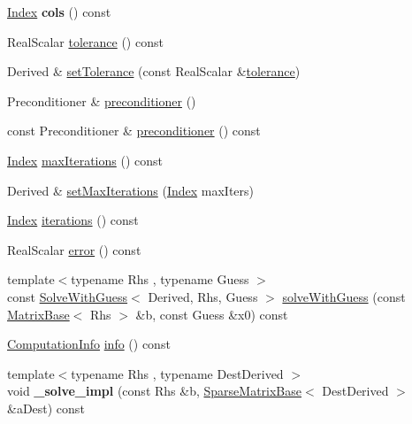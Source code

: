\begin{DoxyCompactItemize}
\hyperlink{namespace_eigen_a62e77e0933482dafde8fe197d9a2cfde}{Index} {\bfseries cols} () const
\item 
Real\+Scalar \hyperlink{group___iterative_linear_solvers___module_acb442c19b5858d6b9be813dd7d36cc62}{tolerance} () const
\item 
Derived \& \hyperlink{group___iterative_linear_solvers___module_ac160a444af8998f93da9aa30e858470d}{set\+Tolerance} (const Real\+Scalar \&\hyperlink{group___iterative_linear_solvers___module_acb442c19b5858d6b9be813dd7d36cc62}{tolerance})
\item 
Preconditioner \& \hyperlink{group___iterative_linear_solvers___module_a5e88f2a323a2900205cf807af94f8051}{preconditioner} ()
\item 
const Preconditioner \& \hyperlink{group___iterative_linear_solvers___module_a709a056e17c49b5272e4971bc376cbe4}{preconditioner} () const
\item 
\hyperlink{namespace_eigen_a62e77e0933482dafde8fe197d9a2cfde}{Index} \hyperlink{group___iterative_linear_solvers___module_a168a74c8dceb6233b220031fdd756ba0}{max\+Iterations} () const
\item 
Derived \& \hyperlink{group___iterative_linear_solvers___module_af83de7a7d31d9d4bd1fef6222b07335b}{set\+Max\+Iterations} (\hyperlink{namespace_eigen_a62e77e0933482dafde8fe197d9a2cfde}{Index} max\+Iters)
\item 
\hyperlink{namespace_eigen_a62e77e0933482dafde8fe197d9a2cfde}{Index} \hyperlink{group___iterative_linear_solvers___module_ae778dd098bd5e6655625b20b1e9f15da}{iterations} () const
\item 
Real\+Scalar \hyperlink{group___iterative_linear_solvers___module_a117c241af3fb1141ad0916a3cf3157ec}{error} () const
\item 
{\footnotesize template$<$typename Rhs , typename Guess $>$ }\\const \hyperlink{group___iterative_linear_solvers___module_class_eigen_1_1_solve_with_guess}{Solve\+With\+Guess}$<$ Derived, Rhs, Guess $>$ \hyperlink{group___iterative_linear_solvers___module_adcc18d1ab283786dcbb5a3f63f4b4bd8}{solve\+With\+Guess} (const \hyperlink{group___core___module_class_eigen_1_1_matrix_base}{Matrix\+Base}$<$ Rhs $>$ \&b, const Guess \&x0) const
\item 
\hyperlink{group__enums_ga85fad7b87587764e5cf6b513a9e0ee5e}{Computation\+Info} \hyperlink{group___iterative_linear_solvers___module_a0d6b459433a316b4f12d48e5c80d61fe}{info} () const
\item 
\mbox{\label{group___iterative_linear_solvers___module_a7c2a35dde0ddb891b4030143ed286743}} 
{\footnotesize template$<$typename Rhs , typename Dest\+Derived $>$ }\\void {\bfseries \+\_\+solve\+\_\+impl} (const Rhs \&b, \hyperlink{group___sparse_core___module_class_eigen_1_1_sparse_matrix_base}{Sparse\+Matrix\+Base}$<$ Dest\+Derived $>$ \&a\+Dest) const
\end{DoxyCompactItemize}

